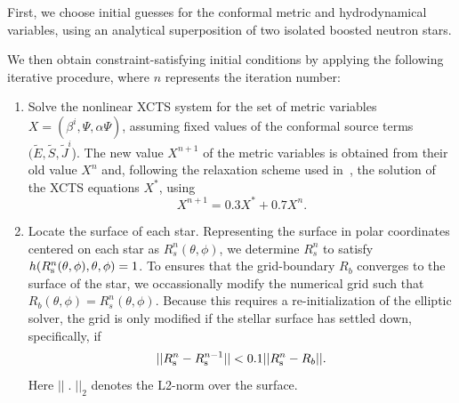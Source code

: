 First, we choose initial guesses
for the conformal metric and hydrodynamical variables, using an
analytical superposition of two isolated boosted neutron stars.

We then obtain constraint-satisfying initial conditions by applying
the following iterative procedure, where $n$ represents the iteration number:
\begin{enumerate}
\item \label{step:1} 
  Solve the nonlinear XCTS system for the set of metric variables $X=(\beta^i,\Psi,\alpha \Psi)$,
  assuming fixed values of the conformal source terms
  $(\tilde{E},\tilde{S},\tilde{J}^i$). The new value $X^{n+1}$ of the
  metric variables is obtained from their old value $X^n$ and,
  following the relaxation scheme used in~\cite{FoucartEtAl:2008}, the
  solution of the XCTS equations $X^*$, using
\begin{equation}
\label{eq:Relaxation}
X^{n+1}=0.3X^*+0.7X^n.
\end{equation}
\item Locate the surface of each star. Representing the surface in polar coordinates centered on each star as $R_s^n(\theta,\phi)$, we determine $R_s^n$ to satisfy~\citep{FoucartEtAl:2008} $h(R^n_{\rm
  s}(\theta,\phi),\theta,\phi)=1$.
To ensures that the grid-boundary $R_b$ converges to the surface of the star, we occassionally modify the numerical grid such that $R_b(\theta,\phi)=R^n_s(\theta,\phi)$. Because this requires a re-initialization of the elliptic solver, the grid is only modified if the stellar surface has settled down, specifically, if
\begin{equation}
||R^n_{\rm s} - R^{n-1}_{\rm s}|| < 0.1 ||R^n_{\rm s} - R_b||.
\end{equation}
Here $||\;.\;||_2$ denotes the L2-norm over the surface.


\end{enumerate}
